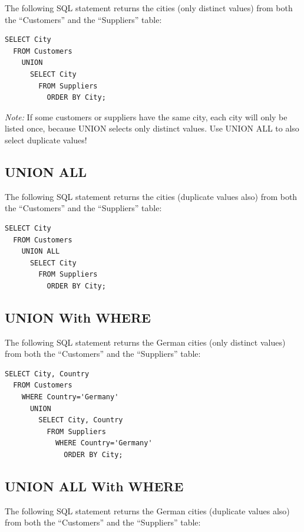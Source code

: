 \documentclass[
]{book}
\begin{document}
The following SQL statement returns the cities (only distinct values) from both the ``Customers'' and the ``Suppliers'' table:

\begin{verbatim}
SELECT City 
  FROM Customers
    UNION
      SELECT City 
        FROM Suppliers
          ORDER BY City;
\end{verbatim}

\emph{Note:} If some customers or suppliers have the same city, each city will only be listed once, because UNION selects only distinct values. Use UNION ALL to also select duplicate values!

\hypertarget{union-all}{%
\subsection{UNION ALL}\label{union-all}}

The following SQL statement returns the cities (duplicate values also) from both the ``Customers'' and the ``Suppliers'' table:

\begin{verbatim}
SELECT City 
  FROM Customers
    UNION ALL
      SELECT City 
        FROM Suppliers
          ORDER BY City;
\end{verbatim}

\hypertarget{union-with-where}{%
\subsection{UNION With WHERE}\label{union-with-where}}

The following SQL statement returns the German cities (only distinct values) from both the ``Customers'' and the ``Suppliers'' table:

\begin{verbatim}
SELECT City, Country 
  FROM Customers
    WHERE Country='Germany'
      UNION
        SELECT City, Country 
          FROM Suppliers
            WHERE Country='Germany'
              ORDER BY City;
\end{verbatim}

\hypertarget{union-all-with-where}{%
\subsection{UNION ALL With WHERE}\label{union-all-with-where}}

The following SQL statement returns the German cities (duplicate values also) from both the ``Customers'' and the ``Suppliers'' table:
\end{document}
